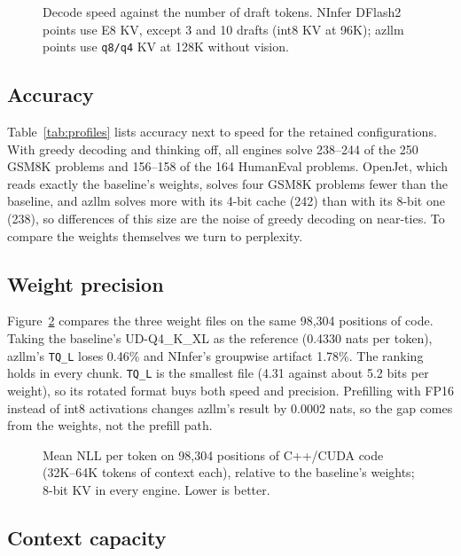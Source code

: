 \begin{figure}[t]
  \centering
  
  \caption{Decode speed against the number of draft tokens. NInfer DFlash2 points use E8 KV,
           except 3 and 10 drafts (int8 KV at 96K); azllm points use \texttt{q8/q4} KV at 128K
           without vision.}
  \label{fig:drafts}
\end{figure}

\subsection{Accuracy}

Table~\ref{tab:profiles} lists accuracy next to speed for the retained configurations. With
greedy decoding and thinking off, all engines solve 238--244 of the 250 GSM8K problems and
156--158 of the 164 HumanEval problems. OpenJet, which reads exactly the baseline's weights,
solves four GSM8K problems fewer than the baseline, and azllm solves more with its 4-bit cache
(242) than with its 8-bit one (238), so differences of this size are the noise of greedy decoding
on near-ties. To compare the weights themselves we turn to perplexity.

\PROFILETABLE

\subsection{Weight precision}

Figure~\ref{fig:weights} compares the three weight files on the same 98{,}304 positions of code.
Taking the baseline's UD-Q4\_K\_XL as the reference (0.4330 nats per token), azllm's
\texttt{TQ\_L} loses 0.46\% and NInfer's groupwise artifact 1.78\%. The ranking holds in every
chunk. \texttt{TQ\_L} is the smallest file (4.31 against about 5.2 bits per weight), so its
rotated format buys both speed and precision. Prefilling with FP16 instead of int8 activations
changes azllm's result by 0.0002 nats, so the gap comes from the weights, not the prefill path.

\begin{figure}[t]
  \centering
  
  \caption{Mean NLL per token on 98{,}304 positions of C++/CUDA code (32K--64K tokens of
           context each), relative to the baseline's weights; 8-bit KV in every engine. Lower is
           better.}
  \label{fig:weights}
\end{figure}

\subsection{Context capacity}


